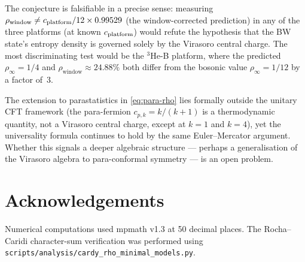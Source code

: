 \documentclass[12pt]{article}
\begin{document}
The conjecture is falsifiable in a precise sense: measuring
$\rho_{\mathrm{window}} \neq c_{\rm platform}/12 \times 0.99529$ (the
window-corrected prediction) in any of the three platforms (at
known $c_{\rm platform}$) would refute the hypothesis that the BW
state's entropy density is governed solely by the Virasoro central
charge.  The most discriminating test would be the ${}^3$He-B platform,
where the predicted $\rho_\infty = 1/4$ and $\rho_{\mathrm{window}} \approx 24.88\%$
both differ from the bosonic value $\rho_\infty = 1/12$ by a factor of~3.

The extension to parastatistics in \eqref{eq:para-rho} lies formally
outside the unitary CFT framework (the para-fermion $c_{p,k} = k/(k+1)$
is a thermodynamic quantity, not a Virasoro central charge, except at
$k=1$ and $k=4$), yet the universality formula continues to hold by
the same Euler--Mercator argument.  Whether this signals a deeper
algebraic structure --- perhaps a generalisation of the Virasoro algebra
to para-conformal symmetry --- is an open problem.

\section*{Acknowledgements}

Numerical computations used mpmath v1.3 at 50 decimal places.
The Rocha--Caridi character-sum verification was performed using
\texttt{scripts/analysis/cardy\_rho\_minimal\_models.py}.
\end{document}
